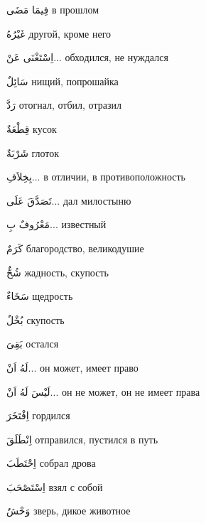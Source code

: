 \documentclass[a5paper]{article}
\newcommand\textstyleDropCaps[1]{#1}
\newcommand\textstyleCaptioncharacters[1]{#1}
\begin{document}
\textstyleCaptioncharacters{فِيمَا مَضَى }\textstyleDropCaps{в прошлом‎}

\textstyleCaptioncharacters{غَيْرُهُ }\textstyleDropCaps{другой, кроме него‎}

\textstyleCaptioncharacters{اِسْتَغْنَى عَنْ... }\textstyleDropCaps{обхо­дился, не нуждался‎}

\textstyleCaptioncharacters{سَائِلٌ }\textstyleDropCaps{нищий, попро­шайка‎}

\textstyleCaptioncharacters{رَدَّ }\textstyleDropCaps{отогнал, отбил, отразил‎}

\textstyleCaptioncharacters{قِطْعَةٌ }\textstyleDropCaps{кусок‎}

\textstyleCaptioncharacters{شَرْبَةٌ }\textstyleDropCaps{глоток‎}

\textstyleCaptioncharacters{بِخِلاَفِ... }\textstyleDropCaps{в отличии, в противоположность ‎}

\textstyleCaptioncharacters{تَصَدَّقَ عَلَى... }\textstyleDropCaps{дал ми­лостыню‎}

\textstyleCaptioncharacters{مَعْرُوفٌ بِ... }\textstyleDropCaps{известный‎}

\textstyleCaptioncharacters{كَرَمٌ }\textstyleDropCaps{благородство, вели­кодушие‎}

\textstyleCaptioncharacters{شُحٌّ }\textstyleDropCaps{жадность, скупость‎}

\textstyleCaptioncharacters{سَخَاءٌ }\textstyleDropCaps{щедрость‎}

\textstyleCaptioncharacters{بُخْلٌ }\textstyleDropCaps{скупость‎}

\textstyleCaptioncharacters{بَقِىَ }\textstyleDropCaps{остался‎}

\textstyleCaptioncharacters{لَهُ اَنْ... }\textstyleDropCaps{он может, имеет право‎}

\textstyleCaptioncharacters{لَيْسَ لَهُ اَنْ... }\textstyleDropCaps{он не мо­жет, он не имеет права‎}

\textstyleCaptioncharacters{اِفْتَخَرَ }\textstyleDropCaps{гордился‎}

\textstyleCaptioncharacters{اِنْطَلَقَ }\textstyleDropCaps{отправился, пу­стился в путь‎}

\textstyleCaptioncharacters{اِحْتَطَبَ }\textstyleDropCaps{собрал дрова‎}

\textstyleCaptioncharacters{اِسْتَصْحَبَ }\textstyleDropCaps{взял с собой‎}

\textstyleCaptioncharacters{وَحْشٌ }\textstyleDropCaps{зверь, дикое жи­вотное‎}
\end{document}

